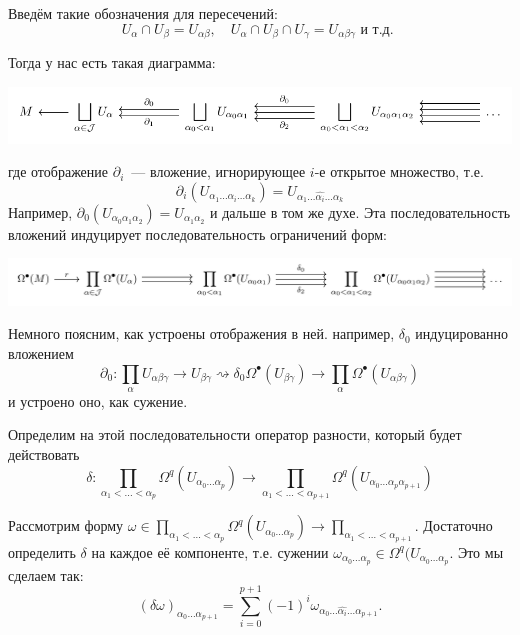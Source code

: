 	  Введём такие обозначения для пересечений: 
	  \[
	  	U_{\alpha} \cap U_{\beta} = U_{\alpha \beta}, \quad U_{\alpha} \cap U_{\beta} \cap U_{\gamma} = U_{\alpha \beta \gamma} \text{ и т.д. }
	  \]

	  Тогда у нас есть такая диаграмма: 

	  \begin{center}
	  	\includegraphics{lectures/7/pictures/cd_33.pdf}
	  \end{center}

	  где отображение $\partial_i$~--- вложение, игнорирующее $i$-е открытое множество, т.е. 
	  \[
	  	\partial_i(U_{\alpha_1 \ldots \alpha_i \ldots \alpha_k}) = U_{\alpha_1 \ldots \widehat{\alpha_i} \ldots \alpha_k}
	  \]
	  Например, $\partial_0(U_{\alpha_0 \alpha_1 \alpha_2}) = U_{\alpha_1 \alpha_2}$ и дальше в том же духе.  Эта последовательность вложений индуцирует последовательность ограничений форм: 

	  \begin{center}
	 		\includegraphics{lectures/7/pictures/cd_34.pdf}
	  \end{center}

	  Немного поясним, как устроены отображения в ней. например, $\delta_0$ индуцированно вложением 
	  \[
	  	\partial_0 \colon \prod_{\alpha} U_{\alpha \beta \gamma} \to U_{\beta \gamma} \rightsquigarrow \delta_0 \Omega^{\bullet}(U_{\beta \gamma}) \to \prod_{\alpha} \Omega^{\bullet}(U_{\alpha \beta \gamma})
	  \]
	  и устроено оно, как сужение. 

	  Определим на этой последовательности оператор разности, который будет действовать 
	  \[
	  	\delta \colon \prod_{\alpha_1 < \ldots < \alpha_p} \Omega^q(U_{ \alpha_0 \ldots \alpha_p}) \to \prod_{\alpha_1 < \ldots < \alpha_{p + 1}} \Omega^q(U_{ \alpha_0 \ldots \alpha_p \alpha_{p + 1}})
	  \]

	  Рассмотрим форму $\omega \in \prod_{\alpha_1 < \ldots < \alpha_p} \Omega^q(U_{ \alpha_0 \ldots \alpha_p}) \to \prod_{\alpha_1 < \ldots < \alpha_{p + 1}}$. Достаточно определить $\delta$ на каждое её компоненте, т.е. сужении $\omega_{\alpha_0 \ldots \alpha_p} \in \Omega^q(U_{ \alpha_0 \ldots \alpha_p}$. Это мы сделаем так: 
	  \[
	  	(\delta \omega)_{\alpha_0 \ldots \alpha_{p + 1}} = \sum_{i = 0}^{p + 1} (-1)^i \omega_{\alpha_0 \ldots \widehat{\alpha_i} \ldots \alpha_{p + 1}}.
	  \]

